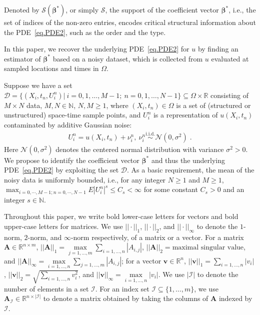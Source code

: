 \documentclass[a4paper,11pt]{article}
\newcommand{\bbeta}{\bm{\beta}}
\begin{document}
Denoted by $\mathcal{S}(\bbeta^*)$, or simply $\mathcal{S}$, the support of the coefficient vector $\bbeta^*$, i.e., the set of indices of the non-zero entries, encodes critical structural information about the PDE~\eqref{eq.PDE2}, such as the order and the type.

In this paper, we recover the underlying PDE~\eqref{eq.PDE2} for $u$ by finding an estimator of $\bbeta^*$ based on a noisy dataset, which is collected from $u$ evaluated at sampled locations and times in $\Omega$.

Suppose we have a set $\mathcal{D}=\{(X_i,t_n,U_i^n)|~i=0,1,\dots,M-1;~n=0,1,\dots,N-1\}\subseteq\Omega\times\mathbb{R}$ consisting of $M\times N$ data, $M,N\in\mathbb{N}$, $N,M\geq 1$, where $(X_i,t_n)\in\Omega$ is a set of (structured or unstructured) space-time sample points, and $U_i^n$ is a representation of $u(X_i,t_n)$ contaminated by additive Gaussian noise:
\begin{align}
U_i^n=	u(X_i,t_n)+\nu_i^n,~\nu_i^n\overset{\text{i.i.d.}}{\sim}\mathcal{N}(0,\sigma^2)\;.
\end{align}
 Here $\mathcal{N}(0,\sigma^2)$ denotes the centered normal distribution with variance $\sigma^2>0$. We propose to identify the coefficient vector $\bbeta^*$ and thus the underlying PDE~\eqref{eq.PDE2} by exploiting the set $\mathcal{D}$.  As a basic requirement, the mean of the noisy data is uniformly bounded, i.e., for any integer $N\geq 1$ and $M\geq 1$, $\max_{i=0,\cdots, M-1; n=0,\cdots,N-1}E|U_i^n|^s\leq C_s<\infty$ for some constant $C_s>0$ and an integer $s\in\mathbb{N}$.


Throughout this paper, we write bold lower-case letters for vectors and bold upper-case letters for matrices. We use $||\cdot||_1$, $||\cdot||_2$, and $||\cdot||_\infty$ to denote the $1$-norm, $2$-norm, and $\infty$-norm respectively, of  a matrix or a vector. For a matrix $\mathbf{A}\in\mathbb{R}^{n\times m}$, $||\mathbf{A}||_1=\underset{j=1,\dots,m}{\max}\sum_{i=1,\dots,n}|A_{i,j}|$, $||\mathbf{A}||_2=\text{maximal singular value}$, and $||\mathbf{A}||_\infty=\underset{i=1,\dots,n}{\max}\sum_{j=1,\dots,m}|A_{i,j}|$; for a vector $\mathbf{v}\in\mathbb{R}^n$, $||\mathbf{v}||_1=\underset{i=1,\dots,n}{\sum}|v_i|$, $||\mathbf{v}||_2=\sqrt{\underset{i=1,\dots,n}{\sum}v_i^2}$, and $||\mathbf{v}||_\infty=\underset{i=1,\dots,n}{\max}|v_i|$. We use $|\mathcal{I}|$ to denote the number of elements in a set $\mathcal{I}$. For an index set $\mathcal{I}\subseteq\{1,\dots,m\}$, we use $\mathbf{A}_\mathcal{I}\in\mathbb{R}^{n\times |\mathcal{I}|}$ to denote a matrix obtained by taking the columns of $\mathbf{A}$ indexed by $\mathcal{I}$.
\end{document}
